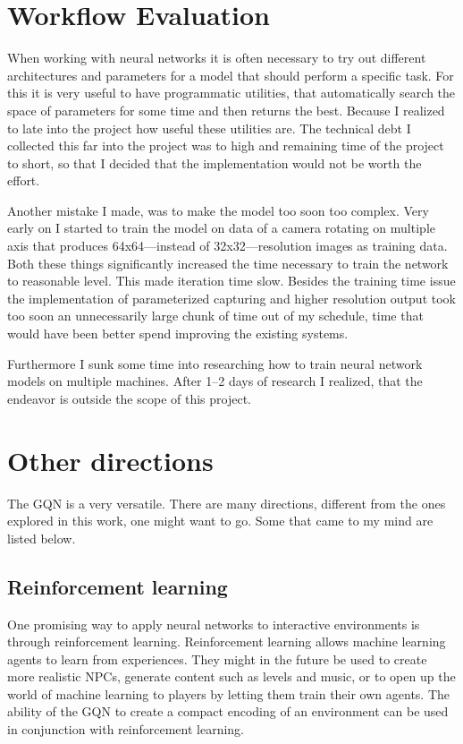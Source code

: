 \section{Workflow Evaluation}
When working with neural networks it is often necessary to try out different architectures and parameters for a model that should perform a specific task. For this it is very useful to have programmatic utilities, that automatically search the space of parameters for some time and then returns the best. Because I realized to late into the project how useful these utilities are. The technical debt I collected this far into the project was to high and remaining time of the project to short, so that I decided that the implementation would not be worth the effort.

Another mistake I made, was to make the model too soon too complex. Very early on I started to train the model on data of a camera rotating on multiple axis that produces 64x64---instead of 32x32---resolution images as training data. Both these things significantly increased the time necessary to train the network to reasonable level. This made iteration time slow. Besides the training time issue the implementation of parameterized capturing and higher resolution output took too soon an unnecessarily large chunk of time out of my schedule, time that would have been better spend improving the existing systems.

Furthermore I sunk some time into researching how to train neural network models on multiple machines. After 1--2 days of research I realized, that the endeavor is outside the scope of this project.


\section{Other directions}
The GQN is a very versatile. There are many directions, different from the ones explored in this work, one might want to go. Some that came to my mind are listed below.

\subsection{Reinforcement learning}
One promising way to apply neural networks to interactive environments is through reinforcement learning. Reinforcement learning allows machine learning agents to learn from experiences. They might in the future be used to create more realistic NPCs, generate content such as levels and music, or to open up the world of machine learning to players by letting them train their own agents. The ability of the GQN to create a compact encoding of an environment can be used in conjunction with reinforcement learning.

